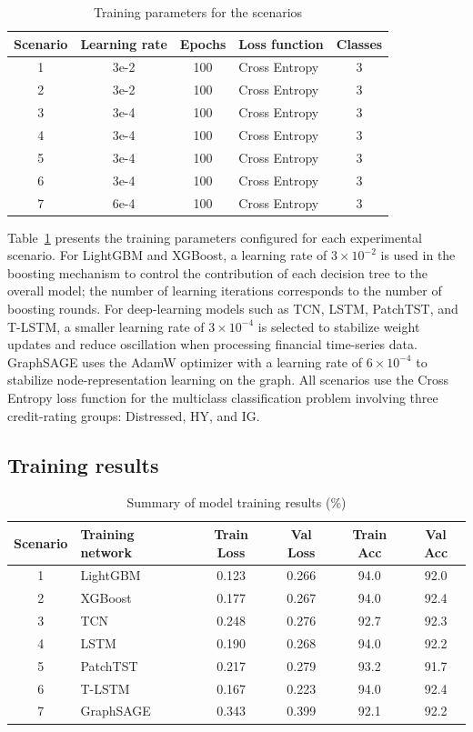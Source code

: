 \documentclass[10pt,twoside]{article}
\begin{document}
\begin{table}[H] 
\centering 
\caption{Training parameters for the scenarios} 
\label{tab:hyperparameter} 
\begin{tabular}{c c c l c} 
\hline 
\textbf{Scenario} & \textbf{Learning rate} & \textbf{Epochs} & \textbf{Loss function} & \textbf{Classes} \\ 
\hline 
1 & 3e-2 & 100 & Cross Entropy & 3 \\ 
2 & 3e-2 & 100 & Cross Entropy & 3 \\ 
3 & 3e-4 & 100 & Cross Entropy & 3 \\ 
4 & 3e-4 & 100 & Cross Entropy & 3 \\ 
5 & 3e-4 & 100 & Cross Entropy & 3 \\ 
6 & 3e-4 & 100 & Cross Entropy & 3 \\ 
7 & 6e-4 & 100 & Cross Entropy & 3 \\ 
\hline 
\end{tabular} 
\end{table}

Table~\ref{tab:hyperparameter} presents the training parameters configured for each experimental scenario. For LightGBM and XGBoost, a learning rate of $3\times10^{-2}$ is used in the boosting mechanism to control the contribution of each decision tree to the overall model; the number of learning iterations corresponds to the number of boosting rounds. For deep-learning models such as TCN, LSTM, PatchTST, and T-LSTM, a smaller learning rate of $3\times10^{-4}$ is selected to stabilize weight updates and reduce oscillation when processing financial time-series data. GraphSAGE uses the AdamW optimizer with a learning rate of $6\times10^{-4}$ to stabilize node-representation learning on the graph. All scenarios use the Cross Entropy loss function for the multiclass classification problem involving three credit-rating groups: Distressed, HY, and IG.
\subsection{Training results}

\begin{table}[H]
\centering
\caption{Summary of model training results (\%)}
\label{tab:training_results}
\begin{tabular}{c l c c c c}
\hline
\textbf{Scenario} & \textbf{Training network} & \textbf{Train Loss} & \textbf{Val Loss} & \textbf{Train Acc} & \textbf{Val Acc} \\
\hline
1 & LightGBM  & 0.123 & 0.266 & 94.0 & 92.0 \\
2 & XGBoost   & 0.177 & 0.267 & 94.0 & 92.4 \\
3 & TCN       & 0.248 & 0.276 & 92.7 & 92.3 \\
4 & LSTM      & 0.190 & 0.268 & 94.0 & 92.2 \\
5 & PatchTST  & 0.217 & 0.279 & 93.2 & 91.7 \\
6 & T-LSTM    & 0.167 & 0.223 & 94.0 & 92.4 \\
7 & GraphSAGE & 0.343 & 0.399 & 92.1 & 92.2 \\
\hline
\end{tabular}
\end{table}
\end{document}
